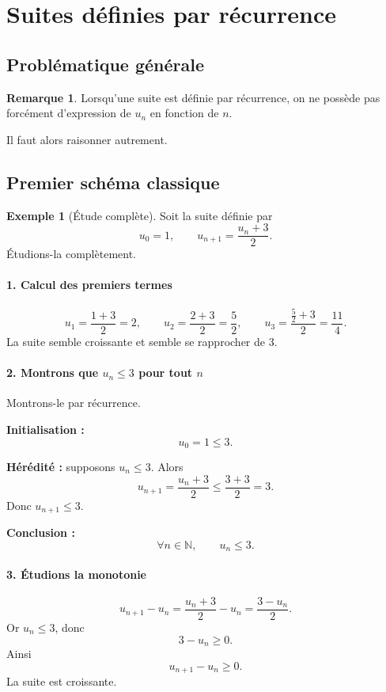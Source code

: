 \documentclass[11pt,a4paper]{article}
\theoremstyle{definition}
\newtheorem{exemple}[definition]{Exemple}
\newtheorem{remarque}[definition]{Remarque}
\theoremstyle{plain}
\theoremstyle{remark}
\newcommand{\N}{\mathbb{N}}
\begin{document}
\section{Suites définies par récurrence}

\subsection{Problématique générale}

\begin{remarque}
Lorsqu'une suite est définie par récurrence, on ne possède pas forcément d'expression de $u_n$ en fonction de $n$.

Il faut alors raisonner autrement.
\end{remarque}

\subsection{Premier schéma classique}

\begin{exemple}[Étude complète]
Soit la suite définie par
\[
u_0=1,\qquad u_{n+1}=\frac{u_n+3}{2}.
\]
Étudions-la complètement.
\end{exemple}

\paragraph{1. Calcul des premiers termes}
\[
u_1=\frac{1+3}{2}=2,\qquad
u_2=\frac{2+3}{2}=\frac52,\qquad
u_3=\frac{\frac52+3}{2}=\frac{11}{4}.
\]
La suite semble croissante et semble se rapprocher de $3$.

\paragraph{2. Montrons que \(u_n\leq 3\) pour tout \(n\)}
Montrons-le par récurrence.

\textbf{Initialisation :}
\[
u_0=1\leq3.
\]

\textbf{Hérédité :} supposons $u_n\leq3$. Alors
\[
u_{n+1}=\frac{u_n+3}{2}\leq \frac{3+3}{2}=3.
\]
Donc $u_{n+1}\leq3$.

\textbf{Conclusion :}
\[
\forall n\in\N,\qquad u_n\leq3.
\]

\paragraph{3. Étudions la monotonie}
\[
u_{n+1}-u_n=\frac{u_n+3}{2}-u_n=\frac{3-u_n}{2}.
\]
Or $u_n\leq3$, donc
\[
3-u_n\geq0.
\]
Ainsi
\[
u_{n+1}-u_n\geq0.
\]
La suite est croissante.
\end{document}
